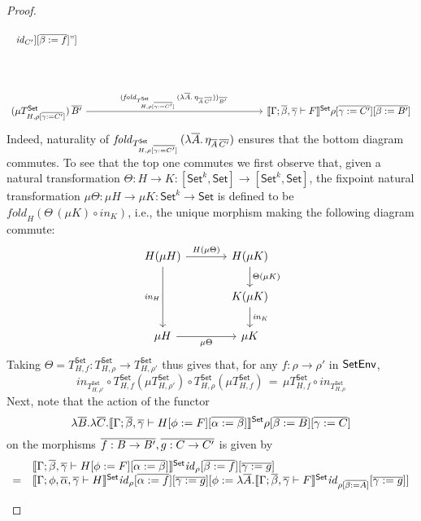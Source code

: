 \documentclass[runningheads]{llncs}
\newcommand{\set}{\mathsf{Set}}
\renewcommand{\id}{\mathit{id}}
\renewcommand{\id}{\mathit{id}}
\begin{document}
\begin{proof}
\begin{itemize}
{\[\begin{tikzcd}[column sep=2.5in, row sep=0.75in]
{{    \id_{C'}}][\ol{\beta := f}]}"]\\
 (\mu T^\set_{H,\rho[\ol{\gamma := C'}]})\, \ol{B'} 
\ar[r,"{(\mathit{fold}_{T^\set_{H,\rho[\ol{\gamma :=
            C'}]}}\,(\lambda \ol{A}.\,\eta_{\ol{A}\,\ol{C'}}))_{\ol{B'}}\,}"
] &  
 \setsem{\Gamma; \ol{\beta},\ol{\gamma} \vdash F}\rho[\ol{\gamma :=
    C'}][\ol{\beta := B'}]
\end{tikzcd}\]}
Indeed, naturality of $\mathit{fold}_{T^\set_{H,\rho[\ol{\gamma :=
        C'}]}}\,(\lambda \ol{A}.\,\eta_{\ol{A}\,\ol{C'}})$ ensures that
the bottom diagram commutes. To see that the top one commutes
we first observe that, given a natural transformation $\Theta : H \to
K : [\set^k, \set] \to [\set^k, \set]$, the fixpoint natural
transformation $\mu \Theta : \mu H \to \mu K : \set^k \to \set$ is
defined to be $\mathit{fold}_{H}(\Theta\,(\mu K) \circ
\mathit{in}_{K})$, i.e., the unique morphism making the following
diagram commute:\label{page:dia1}
{\footnotesize
\[\begin{tikzcd}[column sep = large]
H(\mu H)
	\ar[dd, "{\mathit{in}_H}"']
	\ar[r, "{H(\mu \Theta)}"]
& H(\mu K)
	\ar[d, "{\Theta (\mu K)}"] \\
& K(\mu K)
	\ar[d, "{\mathit{in}_K}"] \\
\mu H
	\ar[r, "{\mu \Theta}"']
& \mu K
\end{tikzcd}\]}
Taking $\Theta = T^{\set}_{H,f}: T^{\set}_{H,\rho} \to
T^{\set}_{H,\rho'}$ thus gives that, for any $f : \rho \to \rho'$ in
$\mathsf{SetEnv}$,
\begin{equation}\label{eq:mu-sigma-def}
\mathit{in}_{T^{\set}_{H,\rho'}} \circ 
T^{\set}_{H,f} (\mu T^{\set}_{H,\rho'}) \circ 
T^{\set}_{H,\rho}(\mu T^{\set}_{H,f}) \,=\, 
\mu T^{\set}_{H,f} \circ \mathit{in}_{T^{\set}_{H,\rho}}
\end{equation}
Next, note that the action of the functor
\[\lambda \ol{B}. \lambda \ol{C}. \setsem{\Gamma; \ol{\beta},
  \ol{\gamma} \vdash H[\phi := F][\ol{\alpha := \beta}]}\rho
        [\ol{\beta := B}] [\ol{\gamma := C}]\]
on the morphisms $\overline{f : B \to B'}, \overline{g : C \to C'}$ is given by
\[\begin{array}{ll}
 & \setsem{\Gamma; \ol{\beta}, \ol{\gamma} \vdash H[\phi :=
      F][\ol{\alpha := \beta}]} \id_{\rho} [\ol{\beta := f}]
           [\ol{\gamma := g}]\\
= & \setsem{\Gamma; \phi, \ol{\alpha}, \ol{\gamma} \vdash H}
\id_{\rho}[\ol{\alpha := f}] [\ol{\gamma := g}][\phi := \lambda
  \ol{A}. \setsem{\Gamma; \ol{\beta}, \ol{\gamma} \vdash F} \id_{\rho
    [\ol{\beta := A}]} [\ol{\gamma := g}]] \\ 

\end{array}\]
\end{itemize}
\end{proof}
\end{document}
